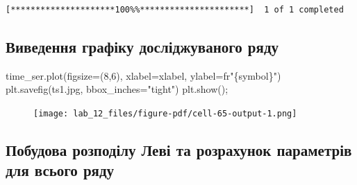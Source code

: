 \documentclass[
  letterpaper,
]{report}
\newenvironment{Shaded}{\begin{snugshade}}{\end{snugshade}}
\newcommand{\DecValTok}[1]{\textcolor[rgb]{0.68,0.00,0.00}{#1}}
\newcommand{\NormalTok}[1]{\textcolor[rgb]{0.00,0.23,0.31}{#1}}
\newcommand{\OperatorTok}[1]{\textcolor[rgb]{0.37,0.37,0.37}{#1}}
\newcommand{\SpecialCharTok}[1]{\textcolor[rgb]{0.37,0.37,0.37}{#1}}
\newcommand{\StringTok}[1]{\textcolor[rgb]{0.13,0.47,0.30}{#1}}
\newcommand{\VerbatimStringTok}[1]{\textcolor[rgb]{0.13,0.47,0.30}{#1}}
\begin{document}
\begin{verbatim}
[*********************100%%**********************]  1 of 1 completed
\end{verbatim}

\hypertarget{ux432ux438ux432ux435ux434ux435ux43dux43dux44f-ux433ux440ux430ux444ux456ux43aux443-ux434ux43eux441ux43bux456ux434ux436ux443ux432ux430ux43dux43eux433ux43e-ux440ux44fux434ux443-1}{%
\subsection{Виведення графіку досліджуваного
ряду}\label{ux432ux438ux432ux435ux434ux435ux43dux43dux44f-ux433ux440ux430ux444ux456ux43aux443-ux434ux43eux441ux43bux456ux434ux436ux443ux432ux430ux43dux43eux433ux43e-ux440ux44fux434ux443-1}}

\begin{Shaded}
\begin{Highlighting}[]
\NormalTok{time\_ser.plot(figsize}\OperatorTok{=}\NormalTok{(}\DecValTok{8}\NormalTok{,}\DecValTok{6}\NormalTok{), xlabel}\OperatorTok{=}\NormalTok{xlabel, ylabel}\OperatorTok{=}\VerbatimStringTok{fr"}\SpecialCharTok{\{}\NormalTok{symbol}\SpecialCharTok{\}}\VerbatimStringTok{"}\NormalTok{)}
\NormalTok{plt.savefig(}\StringTok{\textquotesingle{}ts1.jpg\textquotesingle{}}\NormalTok{, bbox\_inches}\OperatorTok{=}\StringTok{"tight"}\NormalTok{)}
\NormalTok{plt.show()}\OperatorTok{;}
\end{Highlighting}
\end{Shaded}

\begin{figure}[H]

{\centering \texttt{[image: lab\_12\_files/figure-pdf/cell-65-output-1.png]}

}

\end{figure}

\hypertarget{ux43fux43eux431ux443ux434ux43eux432ux430-ux440ux43eux437ux43fux43eux434ux456ux43bux443-ux43bux435ux432ux456-ux442ux430-ux440ux43eux437ux440ux430ux445ux443ux43dux43eux43a-ux43fux430ux440ux430ux43cux435ux442ux440ux456ux432-ux434ux43bux44f-ux432ux441ux44cux43eux433ux43e-ux440ux44fux434ux443}{%
\subsection{Побудова розподілу Леві та розрахунок параметрів для всього
ряду}\label{ux43fux43eux431ux443ux434ux43eux432ux430-ux440ux43eux437ux43fux43eux434ux456ux43bux443-ux43bux435ux432ux456-ux442ux430-ux440ux43eux437ux440ux430ux445ux443ux43dux43eux43a-ux43fux430ux440ux430ux43cux435ux442ux440ux456ux432-ux434ux43bux44f-ux432ux441ux44cux43eux433ux43e-ux440ux44fux434ux443}}
\end{document}
